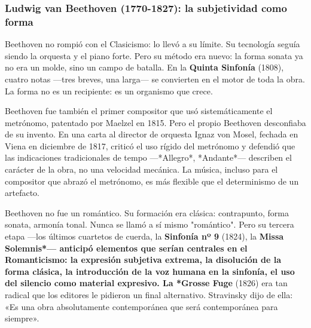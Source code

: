 \documentclass[14pt, a4paper]{article}
\begin{document}
\subsubsection{Ludwig van Beethoven (1770-1827): la subjetividad como forma}
\label{beethoven-clasicismo}
Beethoven no rompió con el Clasicismo: lo llevó a su límite. Su
tecnología seguía siendo la orquesta y el piano forte. Pero su método
era nuevo: la forma sonata ya no era un molde, sino un campo de
batalla. En la \textbf{Quinta Sinfonía} (1808), cuatro notas —tres breves,
una larga— se convierten en el motor de toda la obra. La forma no es
un recipiente: es un organismo que crece.

Beethoven fue también el primer compositor que usó sistemáticamente el
metrónomo, patentado por Maelzel en 1815. Pero el propio Beethoven
desconfiaba de su invento. En una carta al director de orquesta Ignaz
von Mosel, fechada en Viena en diciembre de 1817, criticó el uso
rígido del metrónomo y defendió que las indicaciones tradicionales de
tempo —*Allegro*, *Andante*— describen el carácter de la obra, no una
velocidad mecánica. La música, incluso para el compositor que abrazó
el metrónomo, es más flexible que el determinismo de un artefacto.

Beethoven no fue un romántico. Su formación era clásica: contrapunto,
forma sonata, armonía tonal. Nunca se llamó a sí mismo "romántico".
Pero su tercera etapa —los últimos cuartetos de cuerda, la \textbf{Sinfonía
nº 9} (1824), la \textbf{Missa Solemnis*— anticipó elementos que serían
centrales en el Romanticismo: la expresión subjetiva extrema, la
disolución de la forma clásica, la introducción de la voz humana en la
sinfonía, el uso del silencio como material expresivo. La *Grosse
Fuge} (1826) era tan radical que los editores le pidieron un final
alternativo. Stravinsky dijo de ella: «Es una obra absolutamente
contemporánea que será contemporánea para siempre».
\end{document}
